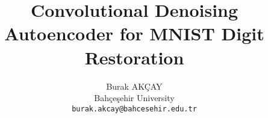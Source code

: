\documentclass[10pt,twocolumn,letterpaper]{article}
\title{Convolutional Denoising Autoencoder for MNIST Digit Restoration}
\author{Burak AKÇAY \\
Bahçeşehir University \\
{\tt\small burak.akcay@bahcesehir.edu.tr}
}
\begin{document}
\maketitle










{
    \small
    
    
}
\end{document}
